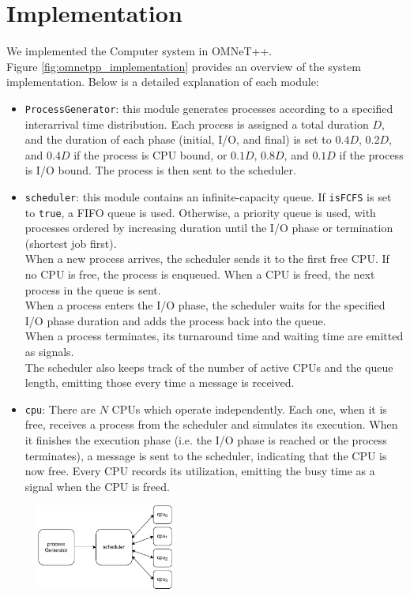 \chapter{Implementation}
We implemented the Computer system in OMNeT++.\\
Figure \autoref{fig:omnetpp_implementation} provides an overview of the system implementation. Below is a detailed explanation of each module:
\begin{itemize}
    \item \texttt{ProcessGenerator}: this module generates processes according to a specified interarrival time distribution. Each process is assigned a total duration $D$, and the duration of each phase (initial, I/O, and final) is set to $0.4 D$, $0.2 D$, and $0.4 D$ if the process is CPU bound, or $0.1 D$, $0.8 D$, and $0.1 D$ if the process is I/O bound. The process is then sent to the scheduler.
    \item \texttt{scheduler}: this module contains an infinite-capacity queue. If \texttt{isFCFS} is set to \texttt{true}, a FIFO queue is used. Otherwise, a priority queue is used, with processes ordered by increasing duration until the I/O phase or termination (shortest job first).\\
    When a new process arrives, the scheduler sends it to the first free CPU. If no CPU is free, the process is enqueued. When a CPU is freed, the next process in the queue is sent.\\
    When a process enters the I/O phase, the scheduler waits for the specified I/O phase duration and adds the process back into the queue.\\
    When a process terminates, its turnaround time and waiting time are emitted as signals.\\
    The scheduler also keeps track of the number of active CPUs and the queue length, emitting those every time a message is received.

    \item \texttt{cpu}: There are $N$ CPUs which operate independently. Each one, when it is free, receives a process from the scheduler and simulates its execution. When it finishes the execution phase (i.e. the I/O phase is reached or the process terminates), a message is sent to the scheduler, indicating that the CPU is now free. Every CPU records its utilization, emitting the busy time as a signal when the CPU is freed.
\end{itemize}

\begin{figure}[H]
    \captionsetup{type=figure}
    \centering
    \includegraphics[width=0.4\textwidth]{images/example/Computer.pdf}
    \label{fig:omnetpp_implementation}
\end{figure}
